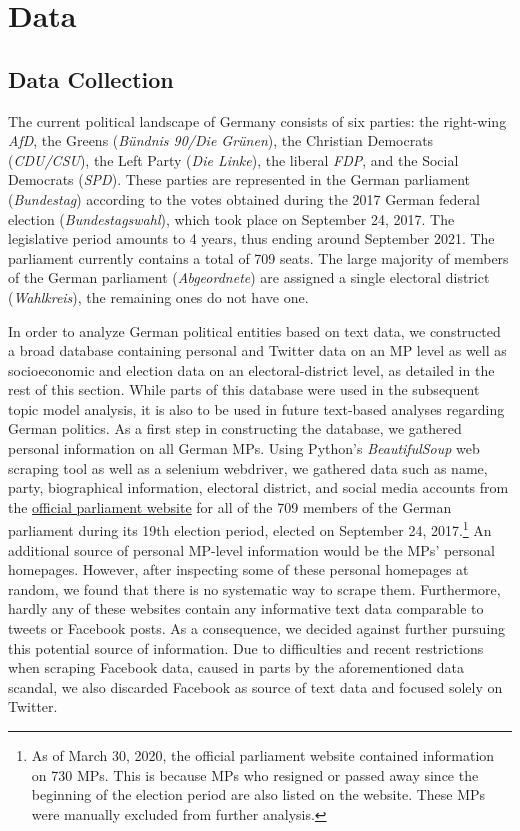 \documentclass[12pt]{article}
\begin{document}
\section{Data}

\subsection{Data Collection}

The current political landscape of Germany consists of six parties: the right-wing \textit{AfD}, the Greens (\textit{Bündnis 90/Die Grünen}), the Christian Democrats (\textit{CDU/CSU}), the Left Party (\textit{Die Linke}), the liberal \textit{FDP}, and the Social Democrats (\textit{SPD}). These parties are represented in the German parliament (\textit{Bundestag}) according to the votes obtained during the 2017 German federal election (\textit{Bundestagswahl}), which took place on September 24, 2017. The legislative period amounts to 4 years, thus ending around September 2021. The parliament currently contains a total of 709 seats. The large majority of members of the German parliament (\textit{Abgeordnete}) are assigned a single electoral district (\textit{Wahlkreis}), the remaining ones do not have one.

In order to analyze German political entities based on text data, we constructed a broad database containing personal and Twitter data on an MP level as well as socioeconomic and election data on an electoral-district level, as detailed in the rest of this section. While parts of this database were used in the subsequent topic model analysis, it is also to be used in future text-based analyses regarding German politics. As a first step in constructing the database, we gathered personal information on all German MPs. Using Python's \textit{BeautifulSoup} web scraping tool as well as a selenium webdriver, we gathered data such as name, party, biographical information, electoral district, and social media accounts from the \href{https://www.bundestag.de/abgeordnete}{official parliament website} for all of the 709 members of the German parliament during its 19th election period, elected on September 24, 2017.\footnote{As of March 30, 2020, the official parliament website contained information on 730 MPs. This is because MPs who resigned or passed away since the beginning of the election period are also listed on the website. These MPs were manually excluded from further analysis.} An additional source of personal MP-level information would be the MPs' personal homepages. However, after inspecting some of these personal homepages at random, we found that there is no systematic way to scrape them. Furthermore, hardly any of these websites contain any informative text data comparable to tweets or Facebook posts. As a consequence, we decided against further pursuing this potential source of information. Due to difficulties and recent restrictions when scraping Facebook data, caused in parts by the aforementioned data scandal, we also discarded Facebook as source of text data and focused solely on Twitter. 
\end{document}
